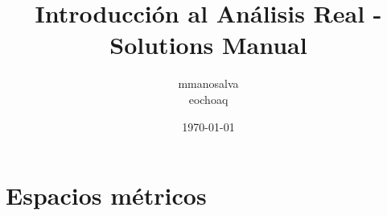 \documentclass[12pt,a4paper]{report}
\title{Introducción al Análisis Real - Solutions Manual}
\author{mmanosalva\\
eochoaq}
\date{\today}
\begin{document}
\maketitle
\tableofcontents
\cleardoublepage


\chapter{Espacios métricos}

\end{document}

